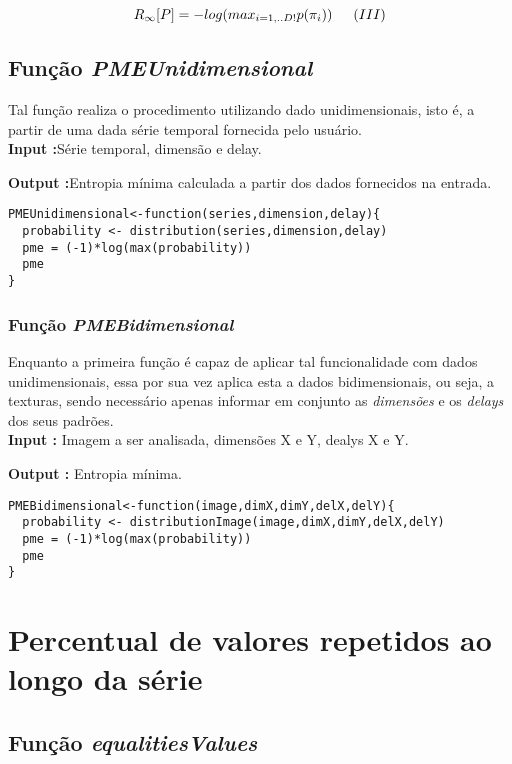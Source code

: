 \documentclass[12pt,letterpaper]{article}
\begin{document}
$$ R_{\infty}[P] = - log(max_{i = 1,..D!}p(\pi_{i})) \indent (III) $$


\subsection{Função \textit{PMEUnidimensional}}

Tal função realiza o procedimento utilizando dado unidimensionais, isto é, a partir de uma dada série temporal fornecida pelo usuário.\\

\textbf{Input :}Série temporal, dimensão e delay.

\textbf{Output :}Entropia mínima calculada a partir dos dados fornecidos na entrada.\\

\begin{lstlisting}
PMEUnidimensional<-function(series,dimension,delay){
  probability <- distribution(series,dimension,delay)
  pme = (-1)*log(max(probability))
  pme
}
\end{lstlisting}

\subsubsection{Função \textit{PMEBidimensional}}

Enquanto a primeira função é capaz de aplicar tal funcionalidade com dados unidimensionais, essa por sua vez aplica esta a dados bidimensionais, ou seja, a texturas, sendo necessário apenas informar em conjunto as \textit{dimensões} e os \textit{delays} dos seus padrões.\\

\textbf{Input :} Imagem a ser analisada, dimensões X e Y, dealys X e Y.

\textbf{Output :} Entropia mínima.\\

\begin{lstlisting}
PMEBidimensional<-function(image,dimX,dimY,delX,delY){
  probability <- distributionImage(image,dimX,dimY,delX,delY)
  pme = (-1)*log(max(probability))
  pme
}
\end{lstlisting}

\section{Percentual de valores repetidos ao longo da série}

\subsection{Função \textit{equalitiesValues}}
\end{document}
